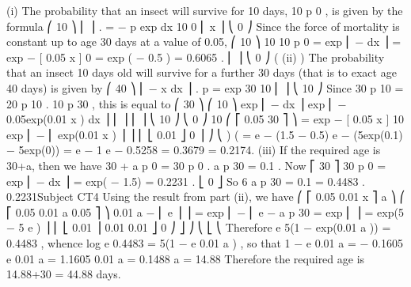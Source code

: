 \documentclass[a4paper,12pt]{article}
\begin{document}

\newpage
(i)
The probability that an insect will survive for 10 days, 10 p 0 , is given by the formula
⎛ 10
⎞
⎜
⎟ .
=
−
\mu
p
exp
dx
10 0
⎜ \int x ⎟
⎝ 0
⎠
Since the force of mortality is constant up to age 30 days at a value of 0.05,
⎛ 10
⎞
10
10 p 0 = exp ⎜ −  dx ⎟ = exp − [ 0.05 x ] 0 = exp ( − 0.5 ) = 0.6065 .
⎜
⎟
⎝ 0
⎠
(
(ii)
)
The probability that an insect 10 days old will survive for a further 30 days (that is to exact age 40 days) is given by
⎛ 40
⎞
⎜ − \int \mu x dx ⎟ .
p
=
exp
30 10
⎜
⎟
⎝ 10
⎠
Since
30 p 10
= 20 p 10 . 10 p 30 , this is equal to
⎛ 30
⎞
⎛ 10
⎞
exp ⎜ −  dx ⎟ exp ⎜ − \int 0.05exp(0.01 x ) dx ⎟
⎜
⎟
⎜
⎟
⎝ 10
⎠
⎝ 0
⎠
10
⎛ ⎡ 0.05
30
⎤ ⎞
= exp − [ 0.05 x ] 10 exp ⎜ − ⎢
exp(0.01 x ) ⎥ ⎟
⎜ ⎣ 0.01
⎦ 0 ⎟ ⎠
⎝
)
(
= e − (1.5 − 0.5) e − (5exp(0.1) − 5exp(0))
= e − 1 e − 0.5258 = 0.3679  = 0.2174.
(iii)
If the required age is 30+a, then we have
30 + a
p 0 =
30
p 0 . a p 30 = 0.1 .
Now
⎡ 30
⎤
30 p 0 = exp ⎢ −  dx ⎥ = exp( − 1.5) = 0.2231 .
⎣ 0
⎦
So
6
a
p 30 =
0.1
= 0.4483 .
0.2231Subject CT4 %
Using the result from part (ii), we have
⎛ ⎡ 0.05 0.01 x ⎤ a ⎞
⎛ ⎡ 0.05 0.01 a 0.05 ⎤ ⎞
0.01 a
− ⎢
e ⎥ ⎟ = exp ⎜ − ⎢
e
−
a p 30 = exp ⎜
⎟ = exp(5 − 5 e )
⎥
⎜ ⎣ 0.01
⎟
0.01
0.01
⎦ 0 ⎠
⎦ ⎠
⎝ ⎣
⎝
Therefore
e 5(1 − exp(0.01 a )) = 0.4483 ,
whence
log e 0.4483 = 5(1 − e 0.01 a ) ,
so that
1 − e 0.01 a = − 0.1605
e 0.01 a = 1.1605
0.01 a = 0.1488
a = 14.88
Therefore the required age is 14.88+30 = 44.88 days.


\newpage
\end{document}
